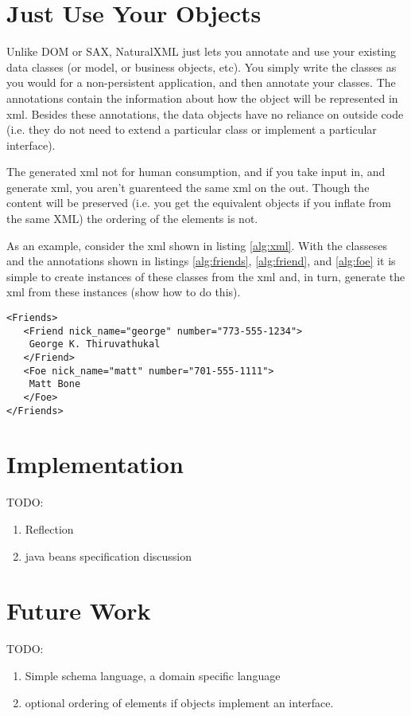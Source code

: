 \section{Just Use Your Objects}
Unlike DOM or SAX, NaturalXML just lets you annotate and use your
existing data classes (or model, or business objects, etc).  You
simply write the classes as you would for a non-persistent
application, and then annotate your classes.  The annotations contain
the information about how the object will be represented in xml.
Besides these annotations, the data objects have no reliance on
outside code (i.e. they do not need to extend a particular class
or implement a particular interface).

The generated xml not for human consumption, and if you take input in, and
generate xml, you aren't guarenteed the same xml on the out.  Though the 
content will be preserved (i.e. you get the equivalent objects if you 
inflate from the same XML) the ordering of the elements is not.

As an example, consider the xml shown in listing \ref{alg:xml}.  With
the classeses and the annotations shown in listings \ref{alg:friends},
\ref{alg:friend}, and \ref{alg:foe} it is simple to create instances
of these classes from the xml and, in turn, generate the xml from these 
instances (show how to do this).

\begin{lstlisting}[float,caption={Friends, Friend and Foe in XML.},label=alg:xml,captionpos=b, frame=single, frameround=tttt]
<Friends>
   <Friend nick_name="george" number="773-555-1234">
    George K. Thiruvathukal
   </Friend>
   <Foe nick_name="matt" number="701-555-1111">
    Matt Bone
   </Foe>
</Friends>
\end{lstlisting}

\section{Implementation}
\noindent TODO:
\begin{enumerate}
 \item Reflection
 \item java beans specification discussion
\end{enumerate}

\section{Future Work}
\noindent TODO:
\begin{enumerate}
  \item Simple schema language, a domain specific language
  \item optional ordering of elements if objects implement an interface.
\end{enumerate}

